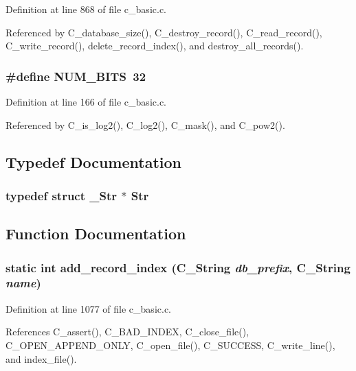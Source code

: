 Definition at line 868 of file c\_\-basic.c.

Referenced by C\_\-database\_\-size(), C\_\-destroy\_\-record(), C\_\-read\_\-record(), C\_\-write\_\-record(), delete\_\-record\_\-index(), and destroy\_\-all\_\-records().
\subsubsection{\setlength{\rightskip}{0pt plus 5cm}\#define NUM\_\-BITS~32}\label{c__basic_8c_4331f5d7557d7b8ae0ec6f3f97bd78c9}




Definition at line 166 of file c\_\-basic.c.

Referenced by C\_\-is\_\-log2(), C\_\-log2(), C\_\-mask(), and C\_\-pow2().

\subsection{Typedef Documentation}
\subsubsection{\setlength{\rightskip}{0pt plus 5cm}typedef struct \bf{\_\-Str} $\ast$ \bf{Str}}\label{c__basic_8c_3add9c18c3e181279703b6230116dbd4}




\subsection{Function Documentation}
\subsubsection{\setlength{\rightskip}{0pt plus 5cm}static int add\_\-record\_\-index (\bf{C\_\-String} {\em db\_\-prefix}, \bf{C\_\-String} {\em name})\hspace{0.3cm}{\tt  [static]}}\label{c__basic_8c_28631511c2c7cf49094e108ddf2abaee}




Definition at line 1077 of file c\_\-basic.c.

References C\_\-assert(), C\_\-BAD\_\-INDEX, C\_\-close\_\-file(), C\_\-OPEN\_\-APPEND\_\-ONLY, C\_\-open\_\-file(), C\_\-SUCCESS, C\_\-write\_\-line(), and index\_\-file().

